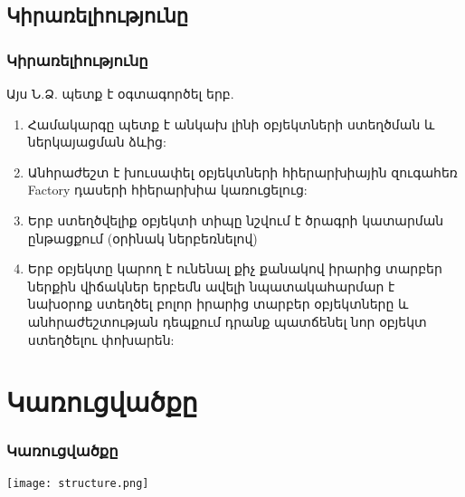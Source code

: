 \documentclass{beamer}
\begin{document}
\subsection{Կիրառելիությունը}
\begin{frame}\frametitle{Կիրառելիությունը}
Այս Ն.Ձ. պետք է օգտագործել երբ.
\vfill
{
    \scriptsize
    \begin{enumerate}
        \item Համակարգը պետք է անկախ լինի օբյեկտների ստեղծման և
        ներկայացման ձևից: \pause \vfill
        \item Անհրաժեշտ է խուսափել օբյեկտների հիերարխիային զուգահեռ Factory
        դասերի հիերարխիա կառուցելուց: \pause \vfill
        \item Երբ ստեղծվելիք օբյեկտի տիպը նշվում է ծրագրի կատարման
        ընթացքում (օրինակ ներբեռնելով) \pause \vfill
        \item Երբ օբյեկտը կարող է ունենալ քիչ քանակով իրարից տարբեր ներքին
        վիճակներ երբեմն ավելի նպատակահարմար է նախօրոք ստեղծել բոլոր իրարից
        տարբեր օբյեկտները և անհրաժեշտության դեպքում դրանք պատճենել նոր օբյեկտ
        ստեղծելու փոխարեն:
    \end{enumerate}
}
\end{frame}

\section{Կառուցվածքը}
\begin{frame}\frametitle{Կառուցվածքը}
\begin{center}
    \texttt{[image: structure.png]}
\end{center}
\end{frame}
\end{document}
